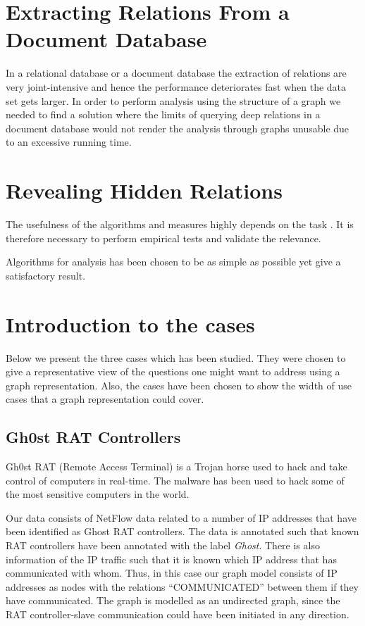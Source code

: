 \section{Extracting Relations From a Document Database}
In a relational database or a document database the extraction of relations are very joint-intensive and hence the performance deteriorates fast when the data set gets larger\cite{robinson2013}. In order to perform analysis using the structure of a graph we needed to find a solution where the limits of querying deep relations in a document database would not render the analysis through graphs unusable due to an excessive running time.


\section{Revealing Hidden Relations}

The usefulness of the algorithms and measures highly depends on the task \cite{fouss2016algorithms}. It is therefore necessary to perform empirical tests and validate the relevance. 

Algorithms for analysis has been chosen to be as simple as possible yet give a satisfactory result. 


\section{Introduction to the cases}
Below we present the three cases which has been studied. They were chosen to give a representative view of the questions one might want to address using a graph representation. Also, the cases have been chosen to show the width of use cases that a graph representation could cover.

\subsection{Gh0st RAT Controllers}
Gh0st RAT (Remote Access Terminal) is a Trojan horse used to hack and take control of computers in real-time. The malware has been used to hack some of the most sensitive computers in the world.

Our data consists of NetFlow data related to a number of IP addresses that have been identified as Ghost RAT controllers. The data is annotated such that known RAT controllers have been annotated with the label \textit{Ghost}. There is also information of the IP traffic such that it is known which IP address that has communicated with whom. Thus, in this case our graph model consists of IP addresses as nodes with the relations ``COMMUNICATED'' between them if they have communicated. The graph is modelled as an undirected graph, since the RAT controller-slave communication could have been initiated in any direction.


